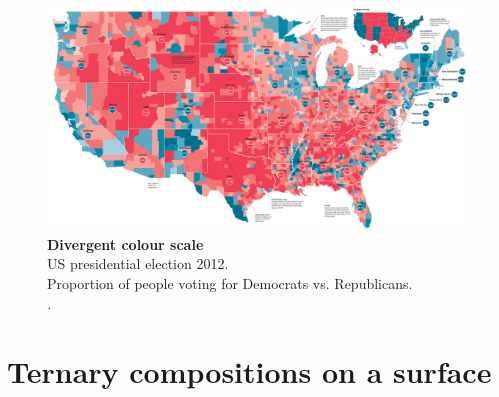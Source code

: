 \documentclass{beamer}
\begin{document}
\begin{frame}
\frametitle{\insertsection}

\begin{figure}[htb!]
\includegraphics[width = \textwidth]{../fig/plot-binary.png} \\
\small \textbf{Divergent colour scale}\\ US presidential election 2012.\\Proportion of people voting for Democrats vs. Republicans.\\\scriptsize\emph{\cite{GuardianGraphics2012}.}
\end{figure}

\end{frame}

\section{Ternary compositions on a surface} %
\end{document}
